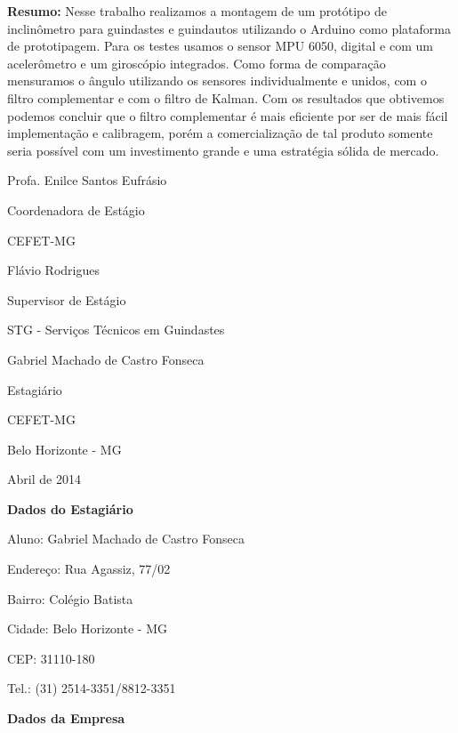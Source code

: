 \documentclass[a4paper,12pt]{article}
\begin{document}
\vspace{2cm}
\noindent
\textbf{Resumo:} Nesse trabalho realizamos a montagem de um protótipo de inclinômetro para guindastes e guindautos utilizando o Arduino como plataforma de prototipagem. Para os testes usamos o sensor MPU 6050, digital e com um acelerômetro e um giroscópio integrados. Como forma de comparação mensuramos o ângulo utilizando os sensores individualmente e unidos, com o filtro complementar e com o filtro de Kalman. Com os resultados que obtivemos podemos concluir que o filtro complementar é mais eficiente por ser de mais fácil implementação e calibragem, porém a comercialização de tal produto somente seria possível com um investimento grande e uma estratégia sólida de mercado.

\vfill

\begin{center}
Profa. Enilce Santos Eufrásio

Coordenadora de Estágio

CEFET-MG

\vfill

Flávio Rodrigues

Supervisor de Estágio

STG - Serviços Técnicos em Guindastes

\vfill

Gabriel Machado de Castro Fonseca

Estagiário

CEFET-MG

\vfill

Belo Horizonte - MG

Abril de 2014
\end{center}

\newpage
\thispagestyle{empty}

\begin{center}
\Large\bf Dados do Estagiário
\end{center}

\vspace{1.5cm}
Aluno: Gabriel Machado de Castro Fonseca

Endereço: Rua Agassiz, 77/02

Bairro: Colégio Batista

Cidade: Belo Horizonte - MG

CEP: 31110-180

Tel.: (31) 2514-3351/8812-3351

\vspace{5cm}

\begin{center}
\Large\bf Dados da Empresa
\end{center}
\end{document}
